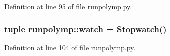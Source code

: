 Definition at line 95 of file runpolymp.py.

\hypertarget{namespacerunpolymp_add54abd046ac5d9e780e62ea08417fbe}{
\subsubsection[{watch}]{\setlength{\rightskip}{0pt plus 5cm}tuple {\bf runpolymp::watch} = Stopwatch()}}
\label{namespacerunpolymp_add54abd046ac5d9e780e62ea08417fbe}


Definition at line 104 of file runpolymp.py.

